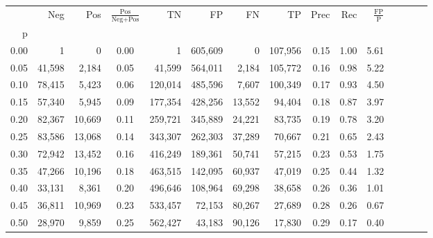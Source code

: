 \begin{tabular}{rrrcrrrrrrrrrrr}
\toprule
{} &     Neg &     Pos & $\frac{\text{Pos}}{\text{Neg}+\text{Pos}}$ &       TN &       FP &       FN &       TP &  Prec &   Rec & $\frac{\text{FP}}{\text{P}}$ \\
p    &         &         &                                            &          &          &          &          &       &       &                              \\
\midrule
0.00 &       1 &       0 &                                       0.00 &        1 &  605,609 &        0 &  107,956 &  0.15 &  1.00 &                         5.61 \\
0.05 &  41,598 &   2,184 &                                       0.05 &   41,599 &  564,011 &    2,184 &  105,772 &  0.16 &  0.98 &                         5.22 \\
0.10 &  78,415 &   5,423 &                                       0.06 &  120,014 &  485,596 &    7,607 &  100,349 &  0.17 &  0.93 &                         4.50 \\
0.15 &  57,340 &   5,945 &                                       0.09 &  177,354 &  428,256 &   13,552 &   94,404 &  0.18 &  0.87 &                         3.97 \\
0.20 &  82,367 &  10,669 &                                       0.11 &  259,721 &  345,889 &   24,221 &   83,735 &  0.19 &  0.78 &                         3.20 \\
0.25 &  83,586 &  13,068 &                                       0.14 &  343,307 &  262,303 &   37,289 &   70,667 &  0.21 &  0.65 &                         2.43 \\
0.30 &  72,942 &  13,452 &                                       0.16 &  416,249 &  189,361 &   50,741 &   57,215 &  0.23 &  0.53 &                         1.75 \\
0.35 &  47,266 &  10,196 &                                       0.18 &  463,515 &  142,095 &   60,937 &   47,019 &  0.25 &  0.44 &                         1.32 \\
0.40 &  33,131 &   8,361 &                                       0.20 &  496,646 &  108,964 &   69,298 &   38,658 &  0.26 &  0.36 &                         1.01 \\
0.45 &  36,811 &  10,969 &                                       0.23 &  533,457 &   72,153 &   80,267 &   27,689 &  0.28 &  0.26 &                         0.67 \\
0.50 &  28,970 &   9,859 &                                       0.25 &  562,427 &   43,183 &   90,126 &   17,830 &  0.29 &  0.17 &                         0.40 \\

\end{tabular}
